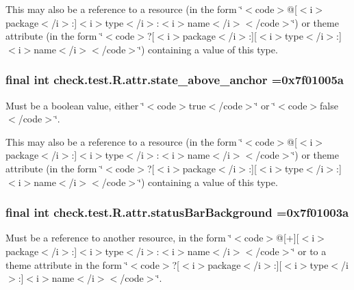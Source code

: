 This may also be a reference to a resource (in the form \char`\"{}$<$code$>$@\mbox{[}$<$i$>$package$<$/i$>$\+:\mbox{]}$<$i$>$type$<$/i$>$\+:$<$i$>$name$<$/i$>$$<$/code$>$\char`\"{}) or theme attribute (in the form \char`\"{}$<$code$>$?\mbox{[}$<$i$>$package$<$/i$>$\+:\mbox{]}\mbox{[}$<$i$>$type$<$/i$>$\+:\mbox{]}$<$i$>$name$<$/i$>$$<$/code$>$\char`\"{}) containing a value of this type. \hypertarget{classcheck_1_1test_1_1_r_1_1attr_a54549315b6f2f0ff9fab6bb732761d35}{}
\subsubsection[{state\+\_\+above\+\_\+anchor}]{\setlength{\rightskip}{0pt plus 5cm}final int check.\+test.\+R.\+attr.\+state\+\_\+above\+\_\+anchor =0x7f01005a\hspace{0.3cm}{\ttfamily [static]}}\label{classcheck_1_1test_1_1_r_1_1attr_a54549315b6f2f0ff9fab6bb732761d35}
Must be a boolean value, either \char`\"{}$<$code$>$true$<$/code$>$\char`\"{} or \char`\"{}$<$code$>$false$<$/code$>$\char`\"{}. 

This may also be a reference to a resource (in the form \char`\"{}$<$code$>$@\mbox{[}$<$i$>$package$<$/i$>$\+:\mbox{]}$<$i$>$type$<$/i$>$\+:$<$i$>$name$<$/i$>$$<$/code$>$\char`\"{}) or theme attribute (in the form \char`\"{}$<$code$>$?\mbox{[}$<$i$>$package$<$/i$>$\+:\mbox{]}\mbox{[}$<$i$>$type$<$/i$>$\+:\mbox{]}$<$i$>$name$<$/i$>$$<$/code$>$\char`\"{}) containing a value of this type. \hypertarget{classcheck_1_1test_1_1_r_1_1attr_a2dad671700479c49f02a7617b4b41b9b}{}
\subsubsection[{status\+Bar\+Background}]{\setlength{\rightskip}{0pt plus 5cm}final int check.\+test.\+R.\+attr.\+status\+Bar\+Background =0x7f01003a\hspace{0.3cm}{\ttfamily [static]}}\label{classcheck_1_1test_1_1_r_1_1attr_a2dad671700479c49f02a7617b4b41b9b}
Must be a reference to another resource, in the form \char`\"{}$<$code$>$@\mbox{[}+\mbox{]}\mbox{[}$<$i$>$package$<$/i$>$\+:\mbox{]}$<$i$>$type$<$/i$>$\+:$<$i$>$name$<$/i$>$$<$/code$>$\char`\"{} or to a theme attribute in the form \char`\"{}$<$code$>$?\mbox{[}$<$i$>$package$<$/i$>$\+:\mbox{]}\mbox{[}$<$i$>$type$<$/i$>$\+:\mbox{]}$<$i$>$name$<$/i$>$$<$/code$>$\char`\"{}. \hypertarget{classcheck_1_1test_1_1_r_1_1attr_a6c4449ac97eb2616059433f47cbaeb84}{}
